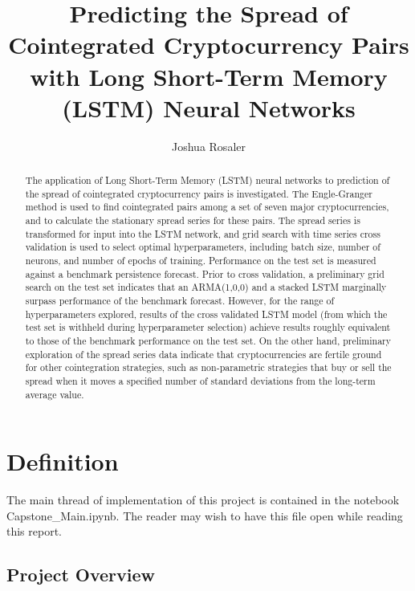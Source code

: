 \documentclass{article}
\begin{document}
\title{Predicting the Spread of Cointegrated Cryptocurrency Pairs with Long Short-Term Memory (LSTM) Neural Networks}
\author{Joshua Rosaler}
\date{}

\maketitle

\begin{abstract}
The application of Long Short-Term Memory (LSTM) neural networks to prediction of the spread of cointegrated cryptocurrency pairs is investigated. The Engle-Granger method is used to find cointegrated pairs among a set of seven major cryptocurrencies, and to calculate the stationary spread series for these pairs. The spread series is transformed for input into the LSTM network, and grid search with time series cross validation is used to select optimal hyperparameters, including batch size, number of neurons, and number of epochs of training. Performance on the test set is measured against a benchmark persistence forecast. Prior to cross validation, a preliminary grid search on the test set indicates that an ARMA(1,0,0) and a stacked LSTM marginally surpass performance of the benchmark forecast. However, for the range of hyperparameters explored, results of the cross validated LSTM model (from which the test set is withheld during hyperparameter selection) achieve results roughly equivalent to those of the benchmark performance on the test set. On the other hand, preliminary exploration of the spread series data indicate that cryptocurrencies are fertile ground for other cointegration strategies, such as non-parametric strategies that buy or sell the spread when it moves a specified number of standard deviations from the long-term average value. 
\end{abstract}

 

\section{Definition}

The main thread of implementation of this project is contained in the notebook Capstone\_Main.ipynb. The reader may wish to have this file open while reading this report. 


\subsection{Project Overview}
 
\end{document}
